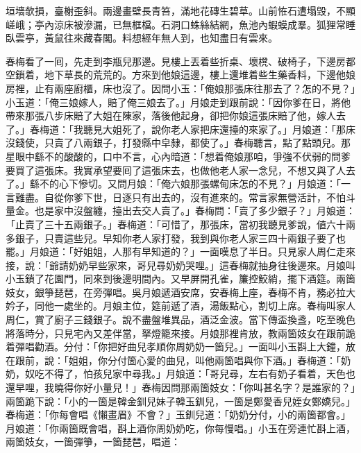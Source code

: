 \begin{myquote}
垣墻欹損，臺榭歪斜。兩邊畫壁長青笞，滿地花磚生碧草。山前恠石遭塌毀，不顯嵯峨；亭內涼床被滲漏，已無框檔。石洞口蛛絲結網，魚池內蝦蟆成羣。狐狸常睡臥雲亭，黃鼠往來藏春閣。料想經年無人到，也知盡日有雲來。
\end{myquote}

春梅看了一囘，先走到李瓶兒那邊。見樓上丟着些折桌、壞櫈、破椅子，下邊房都空鎖着，地下草長的荒荒的。{}方來到他娘這邊，樓上還堆着些生藥香料，下邊他娘房裡，止有兩座廚櫃，床也沒了。因問小玉：「俺娘那張床往那去了？怎的不見？」小玉道：「俺三娘嫁人，賠了俺三娘去了。」月娘走到跟前說：「因你爹在日，將他帶來那張八步床賠了大姐在陳家，落後他起身，卻把你娘這張床賠了他，嫁人去了。」春梅道：「我聽見大姐死了，說你老人家把床還擡的來家了。」月娘道：「那床沒錢使，只賣了八兩銀子，打發縣中皁隸，都使了。」春梅聽言，點了點頭兒。那星眼中繇不的酸酸的，口中不言，心內暗道：「想着俺娘那咱，爭強不伏弱的問爹要買了這張床。我實承望要囘了這張床去，也做他老人家一念兒，不想又與了人去了。」繇不的心下慘切。{}又問月娘：「俺六娘那張螺甸床怎的不見？」月娘道：「一言難盡。自從你爹下世，日逐只有出去的，沒有進來的。常言家無營活計，不怕斗量金。也是家中沒盤纏，擡出去交人賣了。」春梅問：「賣了多少銀子？」月娘道：「止賣了三十五兩銀子。」春梅道：「可惜了，那張床，當初我聽見爹說，値六十兩多銀子，只賣這些兒。早知你老人家打發，我到與你老人家三四十兩銀子要了也罷。」月娘道：「好姐姐，人那有早知道的？」一面嘆息了半日。只見家人周仁走來接，說：「爺請奶奶早些家來，哥兒尋奶奶哭哩。」這春梅就抽身往後邊來。月娘叫小玉鎖了花園門，同來到後邊明間內。又早屏開孔雀，簾控鮫綃，擺下酒筵。兩箇妓女，銀箏琵琶，在旁彈唱。吳月娘遞酒安席，安春梅上座，{}春梅不肯，務必拉大妗子，同他一處坐的。月娘主位，筵前遞了酒，湯飯點心，割切上席。春梅叫家人周仁，賞了廚子三錢銀子。說不盡盤堆異品，酒泛金波。當下傳盃換盞，吃至晚色將落時分，只見宅內又差伴當，拏燈籠來接。月娘那裡肯放，教兩箇妓女在跟前跪着彈唱勸酒。分付：「你把好曲兒孝順你周奶奶一箇兒。」一面叫小玉斟上大鐘，放在跟前，說：「姐姐，你分付箇心愛的曲兒，叫他兩箇唱與你下酒。」春梅道：「奶奶，奴吃不得了，怕孩兒家中尋我。」月娘道：「哥兒尋，左右有奶子看着，天色也還早哩，我曉得你好小量兒！」春梅因問那兩箇妓女：「你叫甚名字？是誰家的？」兩箇跪下說：「小的一箇是韓金釧兒妹子韓玉釧兒，一箇是鄭愛香兒姪女鄭嬌兒。」春梅道：「你每會唱《懶畫眉》不會？」玉釧兒道：「奶奶分付，小的兩箇都會。」月娘道：「你兩箇既會唱，斟上酒你周奶奶吃，你每慢唱。」小玉在旁連忙斟上酒，兩箇妓女，一箇彈箏，一箇琵琶，唱道：

